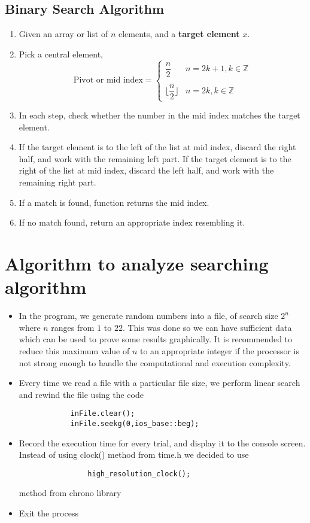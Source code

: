 \documentclass[a4paper, 12pt]{article}
\begin{document}
		\subsection*{Binary Search Algorithm}
	\begin{enumerate}
		\item Given an array or list of $n$ elements, and a \textbf{target element} $x$.
		\item Pick a central element, $$\text{Pivot or mid index}=\begin{cases}\dfrac{n}{2}&n=2k+1,k\in\mathbb{Z}\\\\\Bigg\lfloor\dfrac{n}{2}\Bigg\rfloor& n=2k,k\in\mathbb{Z}\end{cases}$$
		\item In each step, check whether the number in the mid index matches the target element.
		\item If the target element is to the left of the list at mid index, discard the right half, and work with the remaining left part. If the target element is to the right of the list at mid index, discard the left half, and work with the remaining right part.
		\item If a match is found, function returns the mid index.
		\item If no match found, return an appropriate index resembling it.
	\end{enumerate}
	
	\pagebreak
	\section*{Algorithm to analyze searching algorithm}
	\begin{itemize}
		\item In the program, we generate random numbers into a file, of search size $2^n$ where $n$ ranges from $1$ to $22$. This was done so we can have sufficient data which can be used to prove some results graphically. It is recommended to reduce this maximum value of $n$ to an appropriate integer if the processor is not strong enough to handle the computational and execution complexity.
		\item Every time we read a file with a particular file size, we perform linear search and rewind the file using the code
		\begin{lstlisting}
			inFile.clear();
			inFile.seekg(0,ios_base::beg);
		\end{lstlisting}
		
		\item Record the execution time for every trial, and display it to the console screen. Instead of using clock() method from time.h we decided to use 
		\begin{center}
			\begin{lstlisting}
				high_resolution_clock();
			\end{lstlisting}
		\end{center}
		 method from chrono library
		\item Exit the process
	\end{itemize}
	
\end{document}

